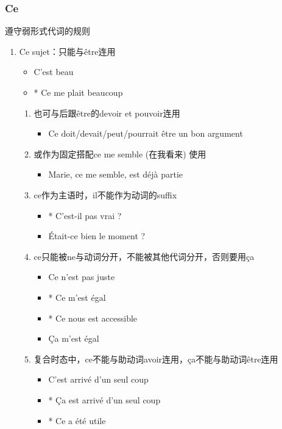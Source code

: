 \documentclass[UTF8]{report}
\begin{document}
\subsubsection{Ce}
遵守弱形式代词的规则
\begin{enumerate}
    \item Ce sujet：只能与être连用
    \begin{itemize}
        \item C’est beau
        \item * Ce me plait beaucoup
    \end{itemize}
    \begin{enumerate}
        \item 也可与后跟être的devoir et pouvoir连用
        \begin{itemize}
            \item Ce doit/devait/peut/pourrait être un bon argument
        \end{itemize}
        \item 或作为固定搭配ce me semble (在我看来) 使用
        \begin{itemize}
            \item Marie, ce me semble, est déjà partie
        \end{itemize}
        \item ce作为主语时，il不能作为动词的suffix
        \begin{itemize}
            \item * C’est-il pas vrai ?
            \item Était-ce bien le moment ?
        \end{itemize}
        \item ce只能被ne与动词分开，不能被其他代词分开，否则要用ça
        \begin{itemize}
            \item Ce n’est pas juste
            \item * Ce m’est égal
            \item * Ce nous est accessible
            \item Ça m’est égal
        \end{itemize}
        \item 复合时态中，ce不能与助动词avoir连用，ça不能与助动词être连用
        \begin{itemize}
            \item C’est arrivé d’un seul coup
            \item * Ça est arrivé d’un seul coup
            \item * Ce a été utile

\end{itemize}
\end{enumerate}
\end{enumerate}
\end{document}
